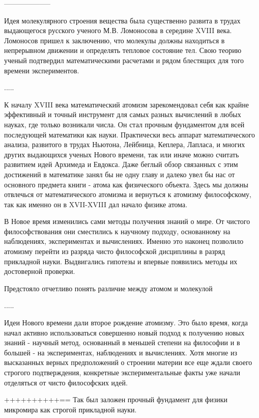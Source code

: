 --------------------

Идея молекулярного строения вещества была существенно развита в трудах выдающегося русского ученого М.В. Ломоносова в середине XVIII века.
Ломоносов пришел к заключению, что молекулы должны находиться в непрерывном движении и определять тепловое состояние тел.
Свою теорию ученый подтвердил математическими расчетами и рядом блестящих для того времени экспериментов.

.....




К началу XVIII века математический атомизм зарекомендовал себя как крайне эффективный и точный инструмент для самых разных вычислений в любых науках, где только возникали числа. 
Он стал прочным фундаментом для всей последующей математики как науки.
Практически весь аппарат математического анализа, развитого в трудах Ньютона, Лейбница, Кеплера, Лапласа, и многих других выдающихся ученых Нового времени, так или иначе можно считать развитием идей Архимеда и Евдокса.
Даже беглый обзор связанных с этим достижений в математике занял бы не одну главу и далеко увел бы нас от основного предмета книги - атома как физического объекта.
Здесь мы должны отвлечься от математического атомизма и вернуться к атомизму философскому, так как именно он в XVII-XVIII дал начало физике атома.


В Новое время изменились сами методы получения знаний о мире.
От чистого философствования они сместились к научному подходу, основанному на наблюдениях, экспериментах и вычислениях.
Именно это наконец позволило атомизму перейти из разряда чисто философской дисциплины в разряд прикладной науки. Выдвигались гипотезы и впервые появились методы их достоверной проверки.

Предстояло отчетливо понять различие между атомом и молекулой

.....



Идеи Нового времени дали второе рождение атомизму.
Это было время, когда начал активно использоваться совершенно новый подход к получению новых знаний - научный метод, основанный в меньшей степени на философии и в большей - на экспериментах, наблюдениях и вычислениях.
Хотя многие из высказанных верных предположений о строении материи все еще ждали своего строгого подтверждения, конкретные экспериментальные факты уже начали отделяться от чисто философских идей.

++++++++++==
Так был заложен прочный фундамент для физики микромира как строгой прикладной науки. 


